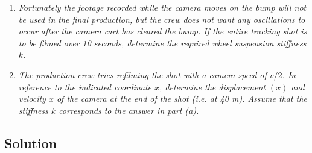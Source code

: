 \begin{enumerate}[label=(\alph*)]
    \item \textit{Fortunately the footage recorded while the camera moves on the bump will not be used in the final production, but the crew does not want any oscillations to occur after the camera cart has cleared the bump. If the entire tracking shot is to be filmed over 10 seconds, determine the required wheel suspension stiffness $k$.}
    \item \textit{The production crew tries refilming the shot with a camera speed of $v/2$. In reference to the indicated coordinate $x$, determine the displacement $(x)$ and velocity $\dot{x}$ of the camera at the end of the shot (i.e. at 40 m). Assume that the stiffness $k$ corresponds to the answer in part (a).}
\end{enumerate}

\subsection*{Solution}

